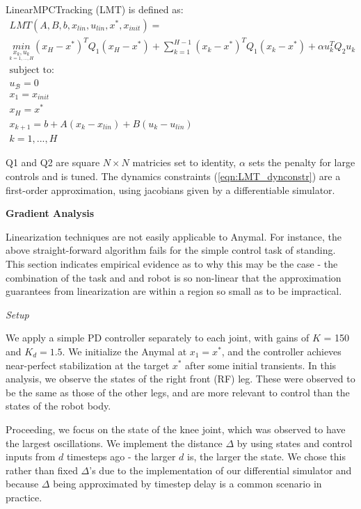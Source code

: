 \documentclass{article}
\begin{document}
LinearMPCTracking (LMT) is defined as:
\begin{gather}
    LMT(A, B, b, x_{lin}, u_{lin}, x^*, x_{init}) = \\
    \underset{\underset{k = 1,...,H}{x_k, u_k}}{min} (x_H - x^*)^T Q_1 (x_H - x^*) + \sum_{k=1}^{H-1} (x_k - x^*)^T Q_1 (x_k - x^*) + \alpha u_k^T Q_2 u_k \\
    \mbox{subject to:} \\
    u_{\mathcal{B}} = 0 \\
    x_1 = x_{init} \\
    x_H = x^* \\
    x_{k+1} = b + A(x_{k} - x_{lin}) + B(u_{k} - u_{lin}) \label{eqn:LMT_dynconstr} \\
    k = {1, ..., H}
\end{gather}

Q1 and Q2 are square $N\times N$ matricies set to identity, $\alpha$ sets the penalty for large controls and is tuned. The dynamics constraints (\ref{eqn:LMT_dynconstr}) are a first-order approximation, using jacobians given by a differentiable simulator.

\begin{center}
    \textbf{Gradient Analysis}
\end{center}

Linearization techniques are not easily applicable to Anymal. For instance, the above straight-forward algorithm fails for the simple control task of standing. This section indicates empirical evidence as to why this may be the case - the combination of the task and and robot is so non-linear that the approximation guarantees from linearization are within a region so small as to be impractical.

\begin{center}
    \textit{Setup}
\end{center}

We apply a simple PD controller separately to each joint, with gains of $K$ = 150 and $K_d = 1.5$. We initialize the Anymal at $x_1 = x^*$, and the controller achieves near-perfect stabilization at the target $x^*$ after some initial transients. In this analysis, we observe the states of the right front (RF) leg. These were observed to be the same as those of the other legs, and are more relevant to control than the states of the robot body.


Proceeding, we focus on the state of the knee joint, which was observed to have the largest oscillations. We implement the distance $\Delta$ by using states and control inputs from $d$ timesteps ago - the larger $d$ is, the larger the state. We chose this rather than fixed $\Delta$'s due to the implementation of our differential simulator and because $\Delta$ being approximated by timestep delay is a common scenario in practice.
\end{document}
